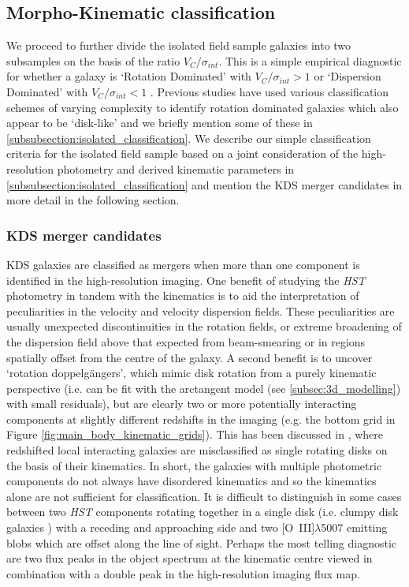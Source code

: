 \documentclass[fleqn,usenatbib]{mn2e}
\begin{document}
\subsection{Morpho-Kinematic classification}\label{subsec:morpho-kin-class}
We proceed to further divide the isolated field sample galaxies into two subsamples on the basis of the ratio $V_{C}/\sigma_{int}$.
This is a simple empirical diagnostic for whether a galaxy is `Rotation Dominated' with $V_{C}/\sigma_{int} > 1$ or `Dispersion Dominated' with $V_{C}/\sigma_{int} < 1$  \citep[i.e. a method to measure the prevalence of rotational and random motions][]{Epinat2012,Wisnioski2015,Stott2016,Harrison2017}.
Previous studies have used various classification schemes of varying complexity to identify rotation dominated galaxies which also appear to be `disk-like' and we briefly mention some of these in \cref{subsubsection:isolated_classification}.
We describe our simple classification criteria for the isolated field sample based on a joint consideration of the high-resolution photometry and derived kinematic parameters in \cref{subsubsection:isolated_classification} and mention the KDS merger candidates in more detail in the following section.

\subsubsection{KDS merger candidates}\label{subsubsection:merger_candidates}
KDS galaxies are classified as mergers when more than one component is identified in the high-resolution imaging.  
One benefit of studying the {\em HST} photometry in tandem with the kinematics is to aid the interpretation of peculiarities in the velocity and velocity dispersion fields.
These peculiarities are usually unexpected discontinuities in the rotation fields, or extreme broadening of the dispersion field above that expected from beam-smearing or in regions spatially offset from the centre of the galaxy.
A second benefit is to uncover `rotation doppelg{\"a}ngers', which mimic disk rotation from a purely kinematic perspective (i.e. can be fit with the arctangent model (see \cref{subsec:3d_modelling}) with small residuals), but are clearly two or more potentially interacting components at slightly different redshifts in the imaging (e.g. the bottom grid in Figure \ref{fig:main_body_kinematic_grids}).
This has been discussed in \cite{Hung2015}, where redshifted local interacting galaxies are misclassified as single rotating disks on the basis of their kinematics. 
In short, the galaxies with multiple photometric components do not always have disordered kinematics and so the kinematics alone are not sufficient for classification.
It is difficult to distinguish in some cases between two {\em HST} components rotating together in a single disk (i.e. clumpy disk galaxies \citep[e.g.][]{Elmegreen2004,Bournaud2007}) with a receding and approaching side and two [O~{\sc III}]$\lambda$5007 emitting blobs which are offset along the line of sight.
Perhaps the most telling diagnostic are two flux peaks in the object spectrum at the kinematic centre viewed in combination with a double peak in the high-resolution imaging flux map. \\
\end{document}
